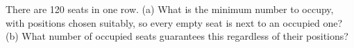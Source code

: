 There are 120 seats in one row. (a) What is the minimum number to occupy, with positions chosen suitably, so every empty seat is next to an occupied one? (b) What number of occupied seats guarantees this regardless of their positions?
